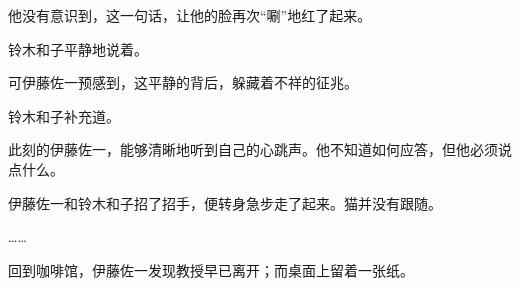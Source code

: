 他没有意识到，这一句话，让他的脸再次“唰”地红了起来。

铃木和子平静地说着。

可伊藤佐一预感到，这平静的背后，躲藏着不祥的征兆。

铃木和子补充道。

此刻的伊藤佐一，能够清晰地听到自己的心跳声。他不知道如何应答，但他必须说点什么。

伊藤佐一和铃木和子招了招手，便转身急步走了起来。猫并没有跟随。

……

回到咖啡馆，伊藤佐一发现教授早已离开；而桌面上留着一张纸。

